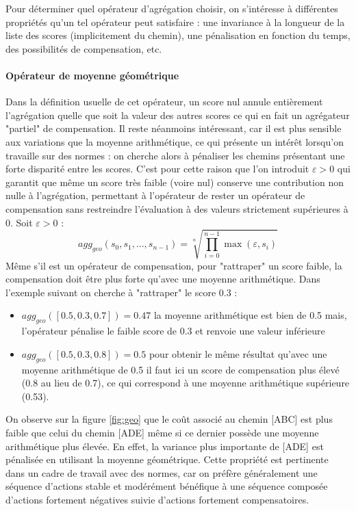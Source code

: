 Pour déterminer quel opérateur d'agrégation choisir, on s'intéresse à différentes propriétés qu'un tel opérateur peut satisfaire : une invariance à la longueur de la liste des scores (implicitement du chemin), une pénalisation en fonction du temps, des possibilités de compensation, etc.


 \paragraph{Opérateur de moyenne géométrique}\label{op_geo}
 Dans la définition usuelle de cet opérateur, un score nul annule entièrement l'agrégation quelle que soit la valeur des autres scores ce qui en fait un agrégateur "partiel" de compensation. Il reste néanmoins intéressant, car il est plus sensible aux variations que la moyenne arithmétique, ce qui présente un intérêt lorsqu'on travaille sur des normes : on cherche alors à pénaliser les chemins présentant une forte disparité entre les scores. C'est pour cette raison que l'on introduit $\varepsilon>0$ qui garantit que même un score très faible (voire nul) conserve une contribution non nulle à l'agrégation, permettant à l'opérateur de rester un opérateur de compensation sans restreindre l'évaluation à des valeurs strictement supérieures à 0.
 Soit $\varepsilon>0$ :
    \begin{equation}
            agg_{geo}(s_0,s_1,\dots,s_{n-1}) =\sqrt[n]{\prod_{i=0}^{n-1} \max (\varepsilon,s_i)} 
    \end{equation}
    Même s'il est un opérateur de compensation, pour "rattraper" un score faible, la compensation doit être plus forte qu'avec une moyenne arithmétique. Dans l'exemple suivant on cherche à "rattraper" le score 0.3 :
    \begin{itemize}
        \item $  agg_{geo}([0.5,0.3,0.7]) = 0.47$ la moyenne arithmétique est bien de 0.5 mais, l'opérateur pénalise le faible score de 0.3 et renvoie une valeur inférieure
        \item $agg_{geo}([0.5,0.3,0.8]) = 0.5$ pour obtenir le même résultat qu'avec une moyenne arithmétique de 0.5 il faut ici un score de compensation plus élevé (0.8 au lieu de 0.7), ce qui correspond à une moyenne arithmétique supérieure (0.53).
        
    \end{itemize}
On observe sur la figure \ref{fig:geo} que le coût associé au chemin [ABC] est plus faible que celui du chemin [ADE] même si ce dernier possède une moyenne arithmétique plus élevée. En effet, la variance plus importante de [ADE] est pénalisée en utilisant la moyenne géométrique. Cette propriété est pertinente dans un cadre de travail avec des normes, car on préfère généralement une séquence d'actions stable et modérément bénéfique à une séquence composée d'actions fortement négatives suivie d'actions fortement compensatoires.

